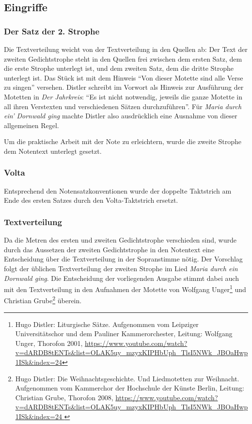\documentclass[a4paper]{book}
\begin{document}
\begin{multicols}{2}
\subsection{Eingriffe}

\subsubsection{Der Satz der 2. Strophe}

Die Textverteilung weicht von der Textverteilung in den Quellen ab: Der
Text der zweiten Gedichtstrophe steht in den Quellen frei zwischen dem
ersten Satz, dem die erste Strophe unterlegt ist, und dem zweiten Satz,
dem die dritte Strophe unterlegt ist. Das Stück ist mit dem Hinweis
``Von dieser Motette sind alle Verse zu singen'' versehen. Distler
schreibt im Vorwort als Hinweis zur Ausführung der Motetten in \emph{Der
Jahrkreis}: ``Es ist nicht notwendig, jeweils die ganze Motette in all
ihren Verstexten und verschiedenen Sätzen durchzuführen''. Für
\emph{Maria durch ein' Dornwald ging} machte Distler also ausdrücklich
eine Ausnahme von dieser allgemeinen Regel.

Um die praktische Arbeit mit der Note zu erleichtern, wurde die zweite
Strophe dem Notentext unterlegt gesetzt.

\subsubsection{Volta}

Entsprechend den Notensatzkonventionen wurde der doppelte Taktstrich am
Ende des ersten Satzes durch den Volta-Taktstrich ersetzt.

\subsubsection{Textverteilung}

Da die Metren des ersten und zweiten Gedichtstrophe verschieden sind,
wurde durch das Aussetzen der zweiten Gedichtstrophe in den Notentext
eine Entscheidung über die Textverteilung in der Sopranstimme nötig. Der
Vorschlag folgt der üblichen Textverteilung der zweiten Strophe im Lied
\emph{Maria durch ein Dornwald ging}. Die Entscheidung der vorliegenden
Ausgabe stimmt dabei auch mit den Textverteilung in den Aufnahmen der
Motette von Wolfgang Unger\footnote{Hugo Distler: Liturgische Sätze.
  Aufgenommen vom Leipziger Universitätschor und dem Pauliner
  Kammerorchester, Leitung: Wolfgang Unger, Thorofon 2001,
  \url{https://www.youtube.com/watch?v=dARDB8tENTs\&list=OLAK5uy\_mzyxKIPHbUph\_TlsI5NWk\_JBOaHwp1ISk\&index=24}}
und Christian Grube\footnote{Hugo Distler: Die Weihnachtsgeschichte. Und
  Liedmotetten zur Weihnacht. Aufgenommen vom Kammerchor der Hochschule
  der Künste Berlin, Leitung: Christian Grube, Thorofon 2008,
  \url{https://www.youtube.com/watch?v=dARDB8tENTs\&list=OLAK5uy\_mzyxKIPHbUph\_TlsI5NWk\_JBOaHwp1ISk\&index=24 }}
überein.


\end{multicols}
\end{document}
